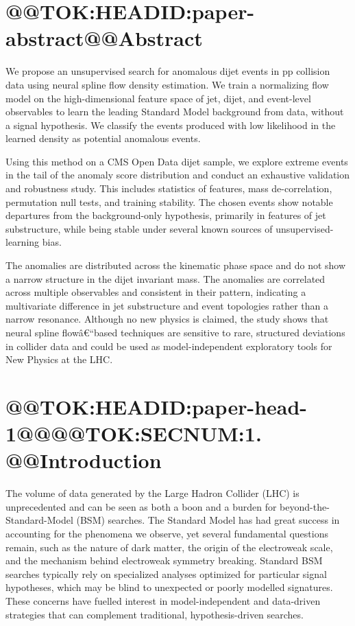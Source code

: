\documentclass[11pt]{article}
\makeatletter
\newenvironment{abstract}{\section*{@@TOK:HEADID:paper-abstract@@Abstract}}{}
\makeatother
\begin{document}
\begin{abstract}
We propose an unsupervised search for anomalous dijet events in pp collision data using neural spline flow density estimation. We train a normalizing flow model on the high-dimensional feature space of jet, dijet, and event-level observables to learn the leading Standard Model background from data, without a signal hypothesis. We classify the events produced with low likelihood in the learned density as potential anomalous events.

Using this method on a CMS Open Data dijet sample, we explore extreme events in the tail of the anomaly score distribution and conduct an exhaustive validation and robustness study. This includes statistics of features, mass de-correlation, permutation null tests, and training stability. The chosen events show notable departures from the background-only hypothesis, primarily in features of jet substructure, while being stable under several known sources of unsupervised-learning bias.

The anomalies are distributed across the kinematic phase space and do not show a narrow structure in the dijet invariant mass. The anomalies are correlated across multiple observables and consistent in their pattern, indicating a multivariate difference in jet substructure and event topologies rather than a narrow resonance. Although no new physics is claimed, the study shows that neural spline flowâ€“based techniques are sensitive to rare, structured deviations in collider data and could be used as model-independent exploratory tools for New Physics at the LHC.
\end{abstract}

\section{@@TOK:HEADID:paper-head-1@@@@TOK:SECNUM:1. @@Introduction}

The volume of data generated by the Large Hadron Collider (LHC) is unprecedented and can be seen as both a boon and a burden for beyond-the-Standard-Model (BSM) searches. The Standard Model has had great success in accounting for the phenomena we observe, yet several fundamental questions remain, such as the nature of dark matter, the origin of the electroweak scale, and the mechanism behind electroweak symmetry breaking. Standard BSM searches typically rely on specialized analyses optimized for particular signal hypotheses, which may be blind to unexpected or poorly modelled signatures. These concerns have fuelled interest in model-independent and data-driven strategies that can complement traditional, hypothesis-driven searches.
\end{document}

